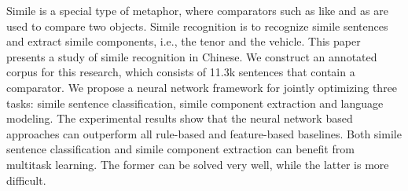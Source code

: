 Simile is a special type of metaphor, where comparators such as like and as are used to compare two objects. Simile recognition is to recognize simile sentences and extract simile components, i.e., the tenor and the vehicle. This paper presents a study of simile recognition in Chinese. We construct an annotated corpus for this research, which consists of 11.3k sentences that contain a comparator. We propose a neural network framework for jointly optimizing three tasks: simile sentence classification, simile component extraction and language modeling. The experimental results show that the neural network based approaches can outperform all rule-based and feature-based baselines. Both simile sentence classification and simile component extraction can benefit from multitask learning. The former can be solved very well, while the latter is more difficult.
